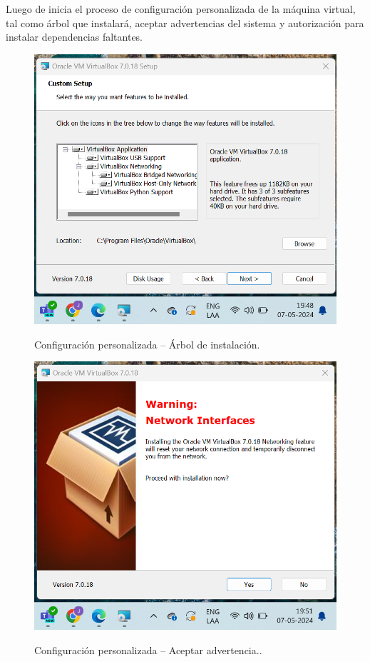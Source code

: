 \documentclass[stu, 11pt, letterpaper, donotrepeattitle, floatsintext, natbib]{apa7}
\begin{document}
\hfill \break
Luego de inicia el proceso de configuración personalizada de la máquina virtual, tal como árbol que instalará, aceptar advertencias del sistema y autorización para instalar dependencias faltantes.
\hfill \break
\begin{figure}[H]
    \centering
    \caption{Configuración personalizada – Árbol de instalación.}
    \includegraphics[width=0.5\linewidth]{imagenCap2/3.png} %
    \label{fig:OverallEffect}
\end{figure}

 \hfill \break
\begin{figure}[H]
    \centering
    \caption{Configuración personalizada – Aceptar advertencia..}
    \includegraphics[width=0.5\linewidth]{imagenCap2/4.png} %
    \label{fig:OverallEffect}
\end{figure}
\end{document}

